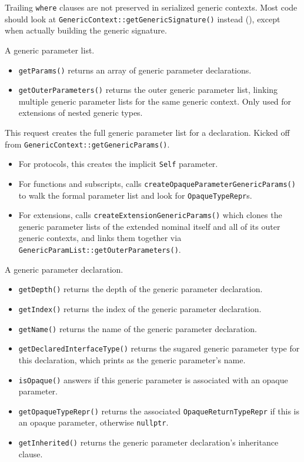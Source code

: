 \documentclass[../generics]{subfiles}
\begin{document}
Trailing \texttt{where} clauses are not preserved in serialized generic contexts. Most code should look at \texttt{GenericContext::getGenericSignature()} instead (), except when actually building the generic signature.


A generic parameter list.
\begin{itemize}
\item \texttt{getParams()} returns an array of generic parameter declarations.
\item \texttt{getOuterParameters()} returns the outer generic parameter list, linking multiple generic parameter lists for the same generic context. Only used for extensions of nested generic types.
\end{itemize}

This request creates the full generic parameter list for a declaration. Kicked off from \texttt{GenericContext::getGenericParams()}.
\begin{itemize}
\item For protocols, this creates the implicit \texttt{Self} parameter.
\item For functions and subscripts, calls \texttt{createOpaqueParameterGenericParams()} to walk the formal parameter list and look for \texttt{OpaqueTypeRepr}s.
\item For extensions, calls \texttt{createExtensionGenericParams()} which clones the generic parameter lists of the extended nominal itself and all of its outer generic contexts, and links them together via \texttt{GenericParamList::getOuterParameters()}.
\end{itemize}

A generic parameter declaration.
\begin{itemize}
\item {}\texttt{getDepth()} returns the depth of the generic parameter declaration.
\item {}\texttt{getIndex()} returns the index of the generic parameter declaration.
\item \texttt{getName()} returns the name of the generic parameter declaration.
\item \texttt{getDeclaredInterfaceType()} returns the sugared generic parameter type for this declaration, which prints as the generic parameter's name.
\item \texttt{isOpaque()} answers if this generic parameter is associated with an opaque parameter.
\item \texttt{getOpaqueTypeRepr()} returns the associated \texttt{OpaqueReturnTypeRepr} if this is an opaque parameter, otherwise \texttt{nullptr}.
\item \texttt{getInherited()} returns the generic parameter declaration's inheritance clause.
\end{itemize}
\end{document}
